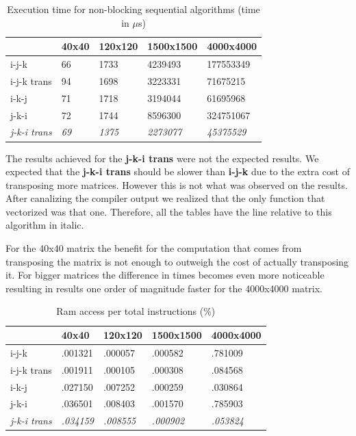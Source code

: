 \documentclass[a4paper]{report}
\begin{document}
\begin{table}[H]
\centering
\begin{tabular}{|l|l|l|l|l|}
\hline
            & 40x40 & 120x120 & 1500x1500 & 4000x4000 \\ \hline
i-j-k       & 66    & 1733    & 4239493   & 177553349 \\ \hline
i-j-k trans & 94    & 1698    & 3223331   & 71675215  \\ \hline
i-k-j       & 71    & 1718    & 3194044   & 61695968  \\ \hline
j-k-i       & 72    & 1744    & 8596300   & 324751067 \\ \hline
\textit{j-k-i trans} & \textit{69}    & \textit{1375}    & \textit{2273077}   &
\textit{45375529}  \\ \hline
\end{tabular}
\caption{Execution time for non-blocking sequential algorithms (time in $\mu$s)}
\end{table}

The results achieved for the \textbf{j-k-i trans} were not the expected results.
We expected that the \textbf{j-k-i trans} should be slower than \textbf{i-j-k}
due to the extra cost of transposing more matrices. However this is not what was
observed on the results. After canalizing the compiler output we realized that
the only function that vectorized was that one. Therefore, all the tables have
the line relative to this algorithm in italic.

For the 40x40 matrix the benefit for the computation that comes from transposing
the matrix is not enough to outweigh the cost of actually transposing it. For
bigger matrices the difference in times becomes even more noticeable resulting in
results one order of magnitude faster for the 4000x4000 matrix.

\begin{table}[H]
\centering
\begin{tabular}{|l|l|l|l|l|}
\hline
            & 40x40   & 120x120 & 1500x1500 & 4000x4000 \\ \hline
i-j-k       & .001321 & .000057 & .000582   & .781009   \\ \hline
i-j-k trans & .001911 & .000105 & .000308   & .084568   \\ \hline
i-k-j       & .027150 & .007252 & .000259   & .030864   \\ \hline
j-k-i       & .036501 & .008403 & .001570   & .785903   \\ \hline
\textit{j-k-i trans} & \textit{.034159} & \textit{.008555} & \textit{.000902}
                     & \textit{.053824}   \\ \hline
\end{tabular}
\caption{Ram access per total instructions (\%)}
\end{table}
\end{document}
